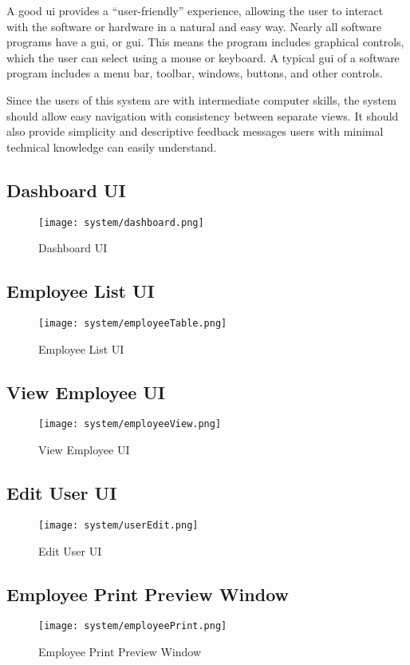 \documentclass[12pt]{report}
\begin{document}
A good \acrshort{ui} provides a ``user-friendly'' experience, allowing the user to interact with the software or hardware in a natural and easy way. Nearly all software programs have a \acrlong{gui}, or \acrshort{gui}. This means the program includes graphical controls, which the user can select using a mouse or
keyboard. A typical \acrshort{gui} of a software program includes a menu bar, toolbar, windows, buttons, and other controls.

Since the users of this system are with intermediate computer skills, the system should allow easy navigation with consistency between separate views. It should also provide simplicity and descriptive feedback messages users with minimal technical knowledge can easily understand.

\subsection{Dashboard UI}
\begin{figure}[H]
	\centering
	\texttt{[image: system/dashboard.png]}
	\caption{Dashboard UI}
\end{figure}

\subsection{Employee List UI}
\begin{figure}[H]
	\centering
	\texttt{[image: system/employeeTable.png]}
	\caption{Employee List UI}
\end{figure}

\subsection{View Employee UI}
\begin{figure}[H]
	\centering
	\texttt{[image: system/employeeView.png]}
	\caption{View Employee UI}
\end{figure}

\subsection{Edit User UI}
\begin{figure}[H]
	\centering
	\texttt{[image: system/userEdit.png]}
	\caption{Edit User UI}
\end{figure}

\subsection{Employee Print Preview Window}
\begin{figure}[H]
	\centering
	\texttt{[image: system/employeePrint.png]}
	\caption{Employee Print Preview Window}
\end{figure}
\end{document}
